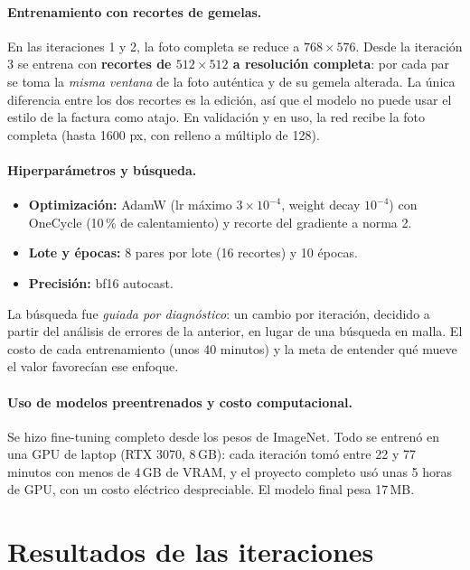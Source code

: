 \documentclass[11pt,letterpaper]{article}
\begin{document}
\paragraph{Entrenamiento con recortes de gemelas.} En las iteraciones 1 y 2, la foto completa se reduce a $768\times576$. Desde la iteración 3 se entrena con \textbf{recortes de $512\times512$ a resolución completa}: por cada par se toma la \emph{misma ventana} de la foto auténtica y de su gemela alterada. La única diferencia entre los dos recortes es la edición, así que el modelo no puede usar el estilo de la factura como atajo. En validación y en uso, la red recibe la foto completa (hasta 1600 px, con relleno a múltiplo de 128).

\paragraph{Hiperparámetros y búsqueda.}
\begin{itemize}
  \item \textbf{Optimización:} AdamW (lr máximo $3\times10^{-4}$, weight decay $10^{-4}$) con OneCycle (10\,\% de calentamiento) y recorte del gradiente a norma 2.
  \item \textbf{Lote y épocas:} 8 pares por lote (16 recortes) y 10 épocas.
  \item \textbf{Precisión:} bf16 autocast.
\end{itemize}
La búsqueda fue \emph{guiada por diagnóstico}: un cambio por iteración, decidido a partir del análisis de errores de la anterior, en lugar de una búsqueda en malla. El costo de cada entrenamiento (unos 40 minutos) y la meta de entender qué mueve el valor favorecían ese enfoque.

\paragraph{Uso de modelos preentrenados y costo computacional.} Se hizo fine-tuning completo desde los pesos de ImageNet. Todo se entrenó en una GPU de laptop (RTX 3070, 8\,GB): cada iteración tomó entre 22 y 77 minutos con menos de 4\,GB de VRAM, y el proyecto completo usó unas 5 horas de GPU, con un costo eléctrico despreciable. El modelo final pesa 17\,MB.

\section{Resultados de las iteraciones}
\label{sec:resultados}
\end{document}
